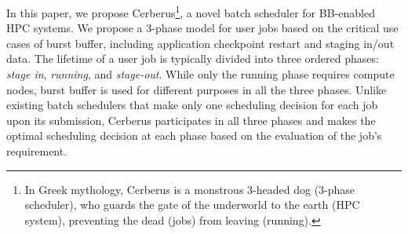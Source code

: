 In this paper, we propose Cerberus\footnote{In Greek mythology,
Cerberus is a monstrous 3-headed dog (3-phase scheduler),
who guards the gate of the underworld to the earth (HPC system),
preventing the dead (jobs) from leaving (running).},
a novel batch scheduler for BB-enabled HPC systems. 
We propose a 3-phase model for user jobs based on the critical use cases of burst buffer, including
application checkpoint restart and staging in/out data. 
The lifetime of a user job is typically divided into three ordered phases:
\textit{stage in}, \textit{running}, and \textit{stage-out}.
While only the running phase requires compute nodes, burst buffer is used for different
purposes in all the three phases.
Unlike existing batch schedulers that make only one scheduling decision for each job upon its submission, 
Cerberus participates in all three phases and makes the optimal scheduling decision at each phase based on the evaluation of the job's requirement.

